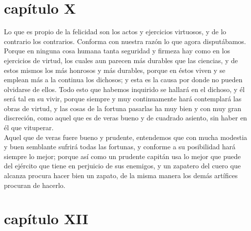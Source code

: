 \begin{multicols}{2}
\section*{capítulo X}
Lo que es propio de la felicidad son los actos y ejercicios virtuosos, y de lo contrario los contrarios. Conforma con nuestra razón lo que agora disputábamos. Porque en ninguna cosa humana tanta seguridad y firmeza hay como en los ejercicios de virtud, los cuales aun parecen más durables que las ciencias, y de estos mismos los más honrosos y más durables, porque en éstos viven y se emplean más a la continua los dichosos; y esta es la causa por donde no pueden olvidarse de ellos. Todo esto que habemos inquirido se hallará en el dichoso, y él será tal en su vivir, porque siempre y muy continuamente hará contemplará las obras de virtud, y las cosas de la fortuna pasarlas ha muy bien y con muy gran discreción, como aquel que es de veras bueno y de cuadrado asiento, sin haber en él que vituperar.\\
Aquel que de veras fuere bueno y prudente, entendemos que con mucha modestia y buen semblante sufrirá todas las fortunas, y conforme a su posibilidad hará siempre lo mejor; porque así como un prudente capitán usa lo mejor que puede del ejército que tiene en perjuicio de sus enemigos, y un zapatero del cuero que alcanza procura hacer bien un zapato, de la misma manera los demás artífices procuran de hacerlo. \\


\section*{capítulo XII}

\end{multicols}

